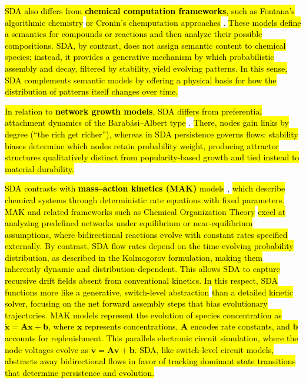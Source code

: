 \documentclass[preprint,12pt]{elsarticle}
\newcommand{\added}[1]{\hl{#1}}
\begin{document}
\added{SDA also differs from \textbf{chemical computation frameworks}, such as
Fontana’s algorithmic chemistry} \cite{fontana1991algorithmic} \added{or Cronin’s
chemputation approaches} \cite{walker2023nature}. \added{These models define a semantics for compounds or reactions and then analyze their possible compositions. SDA, by contrast, does not assign semantic content to chemical species; instead, it
provides a generative mechanism by which probabilistic assembly and decay,
filtered by stability, yield evolving patterns. In this sense, SDA complements
semantic models by offering a physical basis for how the distribution of
patterns itself changes over time.}

\added{In relation to \textbf{network growth models}, SDA differs from
preferential attachment dynamics of the Barabási–Albert type}
\cite{barabasi1999emergence,strogatz2001exploring}. \added{There, nodes gain
links by degree (“the rich get richer”), whereas in SDA persistence governs
flows: stability biases determine which nodes retain probability weight,
producing attractor structures qualitatively distinct from popularity-based
growth and tied instead to material durability.}

\added{SDA contrasts with \textbf{mass–action kinetics (MAK)} models}
\cite{fogler1999chemical,TuranyiTomlin2014,heylighen2019chemical}, 
\added{which describe chemical systems through deterministic rate equations with
fixed parameters. MAK and related frameworks such as Chemical Organization Theory}
\cite{heylighen2019chemical} 
\added{excel at analyzing predefined networks under equilibrium or near-equilibrium
assumptions, where bidirectional reactions evolve with constant rates specified
externally. By contrast, SDA flow rates depend on the time-evolving probability
distribution, as described in the Kolmogorov formulation, making them inherently
dynamic and distribution-dependent. This allows SDA to capture recursive drift
fields absent from conventional kinetics. In this respect, SDA functions more
like a generative, switch-level abstraction}
\cite{AdlerCAD} 
\added{than a detailed kinetic solver, focusing on the net forward assembly steps
that bias evolutionary trajectories. MAK models represent the evolution of
species concentration as $\dot{\mathbf{x}} = \mathbf{A}\mathbf{x} + \mathbf{b}$,
where $\mathbf{x}$ represents concentrations, $\mathbf{A}$ encodes rate constants,
and $\mathbf{b}$ accounts for replenishment. This parallels electronic circuit
simulation, where the node voltages evolve as $\dot{\mathbf{v}} = \mathbf{A}\mathbf{v} + \mathbf{b}$.
SDA, like switch-level circuit models, abstracts away bidirectional flows in favor
of tracking dominant state transitions that determine persistence and evolution.}
\end{document}
